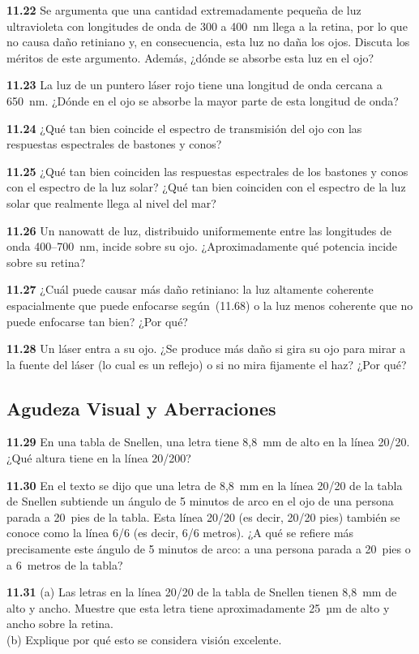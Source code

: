 \documentclass[12pt]{book}
\begin{document}
\textbf{11.22} Se argumenta que una cantidad extremadamente pequeña de luz ultravioleta con longitudes de onda de 300 a 400~nm llega a la retina, por lo que no causa daño retiniano y, en consecuencia, esta luz no daña los ojos. Discuta los méritos de este argumento. Además, ¿dónde se absorbe esta luz en el ojo?

\textbf{11.23} La luz de un puntero láser rojo tiene una longitud de onda cercana a 650~nm. ¿Dónde en el ojo se absorbe la mayor parte de esta longitud de onda?

\textbf{11.24} ¿Qué tan bien coincide el espectro de transmisión del ojo con las respuestas espectrales de bastones y conos?

\textbf{11.25} ¿Qué tan bien coinciden las respuestas espectrales de los bastones y conos con el espectro de la luz solar? ¿Qué tan bien coinciden con el espectro de la luz solar que realmente llega al nivel del mar?

\textbf{11.26} Un nanowatt de luz, distribuido uniformemente entre las longitudes de onda 400--700~nm, incide sobre su ojo. ¿Aproximadamente qué potencia incide sobre su retina?

\textbf{11.27} ¿Cuál puede causar más daño retiniano: la luz altamente coherente espacialmente que puede enfocarse según~(11.68) o la luz menos coherente que no puede enfocarse tan bien? ¿Por qué?

\textbf{11.28} Un láser entra a su ojo. ¿Se produce más daño si gira su ojo para mirar a la fuente del láser (lo cual es un reflejo) o si no mira fijamente el haz? ¿Por qué?

\subsection*{Agudeza Visual y Aberraciones}

\textbf{11.29} En una tabla de Snellen, una letra tiene 8,8~mm de alto en la línea 20/20. ¿Qué altura tiene en la línea 20/200?

\textbf{11.30} En el texto se dijo que una letra de 8,8~mm en la línea 20/20 de la tabla de Snellen subtiende un ángulo de 5 minutos de arco en el ojo de una persona parada a 20~pies de la tabla. Esta línea 20/20 (es decir, 20/20 pies) también se conoce como la línea 6/6 (es decir, 6/6 metros). ¿A qué se refiere más precisamente este ángulo de 5 minutos de arco: a una persona parada a 20~pies o a 6~metros de la tabla?

\textbf{11.31} (a) Las letras en la línea 20/20 de la tabla de Snellen tienen 8,8~mm de alto y ancho. Muestre que esta letra tiene aproximadamente 25~µm de alto y ancho sobre la retina.\\
(b) Explique por qué esto se considera visión excelente.
\end{document}
